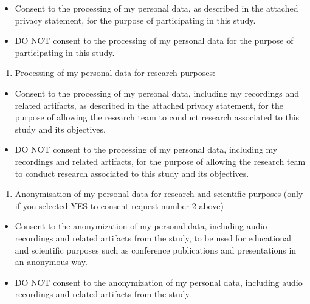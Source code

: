 \documentclass[
  12pt,
]{article}
\providecommand{\tightlist}{%
  \setlength{\itemsep}{0pt}\setlength{\parskip}{0pt}}
\begin{document}
\begin{itemize}
\tightlist
\item[$\square$]
  Consent to the processing of my personal data, as described in the attached privacy statement, for the purpose of participating in this study.
\item[$\square$]
  DO NOT consent to the processing of my personal data for the purpose of participating in this study.
\end{itemize}

\begin{enumerate}
\def\labelenumi{(\arabic{enumi})}
\setcounter{enumi}{1}
\tightlist
\item
  Processing of my personal data for research purposes:
\end{enumerate}

\begin{itemize}
\tightlist
\item[$\square$]
  Consent to the processing of my personal data, including my recordings and related artifacts, as described in the attached privacy statement, for the purpose of allowing the research team to conduct research associated to this study and its objectives.
\item[$\square$]
  DO NOT consent to the processing of my personal data, including my recordings and related artifacts, for the purpose of allowing the research team to conduct research associated to this study and its objectives.
\end{itemize}

\begin{enumerate}
\def\labelenumi{(\arabic{enumi})}
\setcounter{enumi}{2}
\tightlist
\item
  Anonymisation of my personal data for research and scientific purposes (only if you selected YES to consent request number 2 above)
\end{enumerate}

\begin{itemize}
\tightlist
\item[$\square$]
  Consent to the anonymization of my personal data, including audio recordings and related artifacts from the study, to be used for educational and scientific purposes such as conference publications and presentations in an anonymous way.
\item[$\square$]
  DO NOT consent to the anonymization of my personal data, including audio recordings and related artifacts from the study.
\end{itemize}
\end{document}
